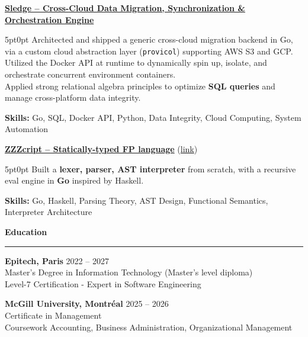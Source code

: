 \documentclass[9pt]{extarticle}
\begin{document}
\underline{\bfseries Sledge -- Cross-Cloud Data Migration, Synchronization \& Orchestration Engine}
\par
\begin{adjustwidth}{5pt}{0pt}
    Architected and shipped a generic cross-cloud migration backend in Go, via a custom cloud abstraction layer (\texttt{provicol}) supporting AWS S3 and GCP. \\
    Utilized the Docker API at runtime to dynamically spin up, isolate, and orchestrate concurrent environment containers. \\
    Applied strong relational algebra principles to optimize {\bfseries SQL queries} and manage cross-platform data integrity.
\end{adjustwidth}
\par
{\bfseries Skills:} Go, SQL, Docker API, Python, Data Integrity, Cloud Computing, System Automation

\par\vspace{1pt}

\underline{\bfseries ZZZcript -- Statically-typed FP language} (\href{https://github.com/paulogarithm/zzzcript}{link})
\par
\begin{adjustwidth}{5pt}{0pt}
	Built a {\bfseries lexer, parser, AST interpreter} from scratch, with a recursive eval engine in {\bfseries Go} inspired by Haskell.
\end{adjustwidth}
\par
{\bfseries Skills:} Go, Haskell, Parsing Theory, AST Design, Functional Semantics, Interpreter Architecture

\par\vspace{1pt}


{\large\bfseries Education}
\par\vspace{-8pt}
\rule{\linewidth}{0.4pt}
\par\vspace{1pt}

{\bfseries Epitech, Paris} \hfill 2022 -- 2027 \\
Master's Degree in Information Technology (Master's level diploma) \\
Level-7 Certification - Expert in Software Engineering

\vspace{1pt}

{\bfseries McGill University, Montréal} \hfill 2025 -- 2026 \\
Certificate in Management \\
Coursework Accounting, Business Administration, Organizational Management
\end{document}
